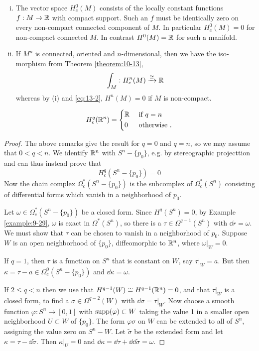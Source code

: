 \begin{remark}\label{remark:13-1}
  \begin{enumerate}[(i)]
    \item The vector space $H_c^0(M)$ consists of the locally constant functions
      $f:M\to{\ensuremath{\mathbb{R}}}$ with compact support. Such an $f$ must be identically zero on
      every non-compact connected component of $M$. In particular $H_c^0(M) = 0$
      for non-compact connected $M$. In contrast $H^0(M)={\mathbb{R}}$ for such a manifold.
    \item If $M^n$ is connected, oriented and $n$-dimensional, then we have the iso­
      morphism from Theorem \ref{theorem:10-13},
      \[
        \int_M:H_c^n(M)\xra[\simee]\RR
      \]
      whereas by (i) and \eqref{eq:13-2}, $H^n(M)=0$ if $M$ is non-compact.
  \end{enumerate}
\end{remark}

\begin{lemma}\label{lemma:13-2}
\[
  H_c^q({\mathbb{R}}^n) = \left\{\begin{aligned}
    & {\mathbb{R}} && \text{ if } q = n\\
    & 0 && \text{ otherwise }.
  \end{aligned}\right.
\]
\end{lemma}

\begin{proof}
  The above remarks give the result for $q=0$ and $q=n$, so we may assume that $0<q<n$. We identify ${\mathbb{R}}^n$ with 
  $S^n-\{p_0\}$, e.g. by stereographic projecttion and can thus instead prove that 
  \[
    H_c^q(S^n-\{p_0\}) = 0
  \]
  Now the chain complex $\Omega_c^*(S^n-\{p_0\})$ is the subcomplex of $\Omega_c^*(S^n)$ consisting of differential
  forms which vanish in a neighborhood of $p_0$.

  Let $\omega\in\Omega_c^*(S^n-\{p_0\})$ be a closed form. Since $H^q(S^n) = 0$, by Example \ref{example:9-29},
  $\omega$ is exact in $\Omega^*(S^n)$, so there is a $\tau\in\Omega^{q-1}(S^n)$ with $\dd r=\omega$. We must show 
  that $\tau$ can be chosen to vanish in a neighborhood of $p_0$. Suppose $W$ is an open neighborhood of $\{p_0\}$,
  diffeomorphic to ${\mathbb{R}}^n$, where $\omega|_W = 0$.

  If $q = 1$, then $\tau$ is a function on $S^n$ that is constant on $W$, say $\tau|_W=a$. But then $\kappa=\tau-a\in\Omega_c^0(S^n-\{p_0\})$
  and $\dd\kappa=\omega$.

  If $2\le q<n$ then we use that $H^{q-1}(W)\cong H^{q-1}({\mathbb{R}}^n) = 0$, and that $\tau|_W$ is a closed 
  form, to find a $\sigma\in\Omega^{q-2}(W)$ with $\dd\sigma=\tau|_W$. Now choose a smooth function $\varphi:S^n\to[0, 1]$
  with $\operatorname{supp}(\varphi)\subset W$ taking the value 1 in a smaller open neighborhood $U\subset W$ of $\{p_0\}$. The form 
  $\varphi\sigma$ on $W$ can be extended to all of $S^n$, assigning the value zero on $S^n-W$. Let $\tilde{\sigma}$ be 
  the extended form and let $\kappa=\tau-\dd\tilde{\sigma}$. Then $\kappa|_U = 0$ and $\dd\kappa=\dd\tau+\dd\dd\tilde{\sigma}
  =\omega$.
\end{proof}

